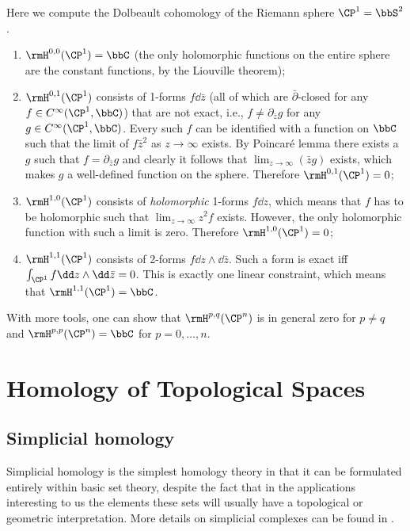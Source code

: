 \begin{example}
    Here we compute the Dolbeault cohomology of the Riemann sphere $\CP^1=\bbS^2$.
    \begin{enumerate}
        \item $\rmH^{0,0}(\CP^1)=\bbC$ (the only holomorphic functions on the entire sphere are the constant functions, by the Liouville theorem);
        \item $\rmH^{0,1}(\CP^1)$ consists of 1-forms $f\dd\bar z$ (all of which are $\bar\partial$-closed for any $f\in C^\infty(\CP^1,\bbC)$) that are not exact, i.e., $f\neq \partial_{\bar z} g$ for any $g\in C^\infty(\CP^1,\bbC)$. Every such $f$ can be identified with a function on $\bbC$ such that the limit of $f \bar z^2$ as $z\to\infty$ exists. By Poincar\'e lemma there exists a $g$ such that $f=\partial_{\bar z} g$ and clearly it follows that $\lim_{z\to\infty}(\bar zg)$ exists, which makes $g$ a well-defined function on the sphere. Therefore $\rmH^{0,1}(\CP^1)=0$;
        \item $\rmH^{1,0}(\CP^1)$ consists of \emph{holomorphic} 1-forms $f\dd z$, which means that $f$ has to be holomorphic such that $\lim_{z\to\infty}z^2f$ exists. However, the only holomorphic function with such a limit is zero. Therefore $\rmH^{1,0}(\CP^1)=0$;
        \item $\rmH^{1,1}(\CP^1)$ consists of 2-forms $f\dd z\wedge\dd\bar z$. Such a form is exact iff $\int_{\CP^1}f\dd z\wedge\dd \bar z=0$. This is exactly one linear constraint, which means that $\rmH^{1,1}(\CP^1)=\bbC$.
    \end{enumerate}
    With more tools, one can show that $\rmH^{p,q}(\CP^n)$ is in general zero for $p\neq q$ and $\rmH^{p,p}(\CP^n)=\bbC$ for $p=0,\ldots,n$.
\end{example}




\clearpage
\chapter{Homology of Topological Spaces}


\section{Simplicial homology}

Simplicial homology is the simplest homology theory in that it can be formulated entirely within basic set theory, despite the fact that in the applications interesting to us the elements these sets will usually have a topological or geometric interpretation. More details on simplicial complexes can be found in \cite{tomDieck}.

